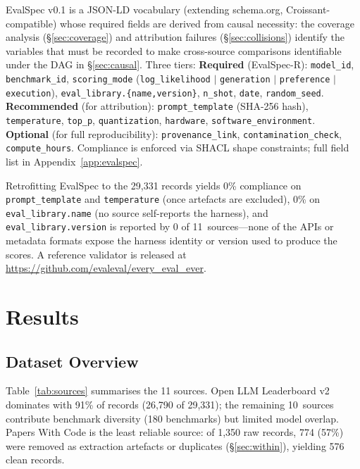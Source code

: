 \documentclass[11pt]{article}
\begin{document}
EvalSpec v0.1 is a JSON-LD vocabulary (extending schema.org,
Croissant-compatible) whose required fields are derived from
causal necessity: the coverage analysis (\S\ref{sec:coverage})
and attribution failures (\S\ref{sec:collisions}) identify the
variables that must be recorded to make cross-source comparisons
identifiable under the DAG in \S\ref{sec:causal}. Three tiers:
\textbf{Required} (EvalSpec-R): \texttt{model\_id},
\texttt{benchmark\_id}, \texttt{scoring\_mode}
(\texttt{log\_likelihood} $|$ \texttt{generation} $|$
\texttt{preference} $|$ \texttt{execution}),
\texttt{eval\_library.\{name,version\}}, \texttt{n\_shot},
\texttt{date}, \texttt{random\_seed}.
\textbf{Recommended} (for attribution):
\texttt{prompt\_template} (SHA-256 hash), \texttt{temperature},
\texttt{top\_p}, \texttt{quantization}, \texttt{hardware},
\texttt{software\_environment}.
\textbf{Optional} (for full reproducibility):
\texttt{provenance\_link}, \texttt{contamination\_check},
\texttt{compute\_hours}. Compliance is enforced via SHACL
shape constraints; full field list in
Appendix~\ref{app:evalspec}.

Retrofitting EvalSpec to the 29{,}331 records yields 0\%
compliance on \texttt{prompt\_template} and \texttt{temperature}
(once artefacts are excluded), 0\% on
\texttt{eval\_library.name} (no source
self-reports the harness), and \texttt{eval\_library.version}
is reported by 0 of 11~sources---none of the APIs or metadata
formats expose the harness identity or version used to produce
the scores.
A reference validator is released at
\url{https://github.com/evaleval/every\_eval\_ever}.

\section{Results}\label{sec:results}

\subsection{Dataset Overview}

Table~\ref{tab:sources} summarises the 11 sources. Open LLM
Leaderboard v2 dominates with 91\% of records (26,790 of 29,331);
the remaining 10~sources contribute benchmark diversity
(180 benchmarks) but limited model overlap. Papers With Code is
the least reliable source: of 1,350 raw records, 774 (57\%) were
removed as extraction artefacts or duplicates (\S\ref{sec:within}),
yielding 576 clean records.
\end{document}
